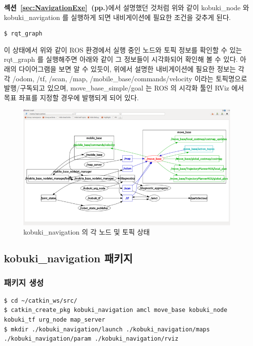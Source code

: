 \noindent
\textbf{섹션~\ref{sec:NavigationExe}~(pp.\pageref{sec:NavigationExe})}에서 설명했던 것처럼 위와 같이 kobuki\_node 와 kobuki\_navigation 를 실행하게 되면 내비게이션에 필요한 조건을 갖추게 된다. 

\vspace{\baselineskip}
\begin{lstlisting}[language=ROS]
$ rqt_graph
\end{lstlisting}

이 상태에서 위와 같이 ROS 환경에서 실행 중인 노드와 토픽 정보를 확인할 수 있는 rqt\_graph 를 실행해주면 아래와 같이 그 정보들이 시각화되어 확인해 볼 수 있다. 아래의 다이어그램을 보면 알 수 있듯이, 위에서 설명한 내비게이션에 필요한 정보는 각각 /odom, /tf,  /scan, /map, /mobile\_base/commands/velocity 이라는 토픽명으로 발행/구독되고 있으며, move\_base\_simple/goal 는 ROS 의 시각화 툴인 RViz 에서 목표 좌표를 지정할 경우에 발행되게 되어 있다.

\begin{figure}[h]
\centering
\includegraphics[width=\columnwidth]{pictures/chapter11/navigation_qt_graph.png}
\caption{kobuki\_navigation 의 각 노드 및 토픽 상태}
\end{figure}

\subsection{kobuki\_navigation 패키지}

\subsubsection{패키지 생성}

\vspace{\baselineskip}
\begin{lstlisting}[language=ROS]
$ cd ~/catkin_ws/src/
$ catkin_create_pkg kobuki_navigation amcl move_base kobuki_node kobuki_tf urg_node map_server
$ mkdir ./kobuki_navigation/launch ./kobuki_navigation/maps ./kobuki_navigation/param ./kobuki_navigation/rviz
\end{lstlisting}

